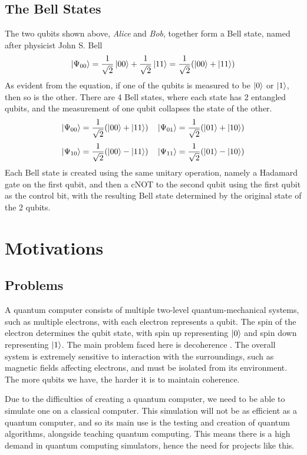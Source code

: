 \documentclass[a4paper,11pt, titlepage, twoside]{article}
\begin{document}
\subsection{The Bell States}
The two qubits shown above, \textit{Alice} and \textit{Bob}, together form a Bell state, named after physicist John S. Bell
$$\ket{\Psi_{00}} = \frac{1}{\sqrt{2}}\ket{00} + \frac{1}{\sqrt{2}}\ket{11} = \frac{1}{\sqrt{2}}(\ket{00} + \ket{11})$$
As evident from the equation, if one of the qubits is measured to be $\ket{0}$ or $\ket{1}$, then so is the other. There are 4 Bell states, where each state has 2 entangled qubits, and the measurement of one qubit collapses the state of the other.
$$\ket{\Psi_{00}} = \frac{1}{\sqrt{2}}(\ket{00} + \ket{11}) \quad \ket{\Psi_{01}} = \frac{1}{\sqrt{2}}(\ket{01} + \ket{10})$$
$$\ket{\Psi_{10}} = \frac{1}{\sqrt{2}}(\ket{00} - \ket{11}) \quad \ket{\Psi_{11}} = \frac{1}{\sqrt{2}}(\ket{01} - \ket{10})$$
Each Bell state is created using the same unitary operation, namely a Hadamard gate on the first qubit, and then a cNOT to the second qubit using the first qubit as the control bit, with the resulting Bell state determined by the original state of the 2 qubits.

\section{Motivations}
\subsection{Problems}
A quantum computer consists of multiple two-level quantum-mechanical systems, such as multiple electrons, with each electron represents a qubit. The spin of the electron determines the qubit state, with spin up representing $\ket{0}$ and spin down representing $\ket{1}$. The main problem faced here is decoherence \cite{decoherence2}. The overall system is extremely sensitive to interaction with the surroundings, such as magnetic fields affecting electrons, and must be isolated from its environment. The more qubits we have, the harder it is to maintain coherence.\par
Due to the difficulties of creating a quantum computer, we need to be able to simulate one on a classical computer. This simulation will not be as efficient as a quantum computer, and so its main use is the testing and creation of quantum algorithms, alongside teaching quantum computing. This means there is a high demand in quantum computing simulators, hence the need for projects like this.
\end{document}
